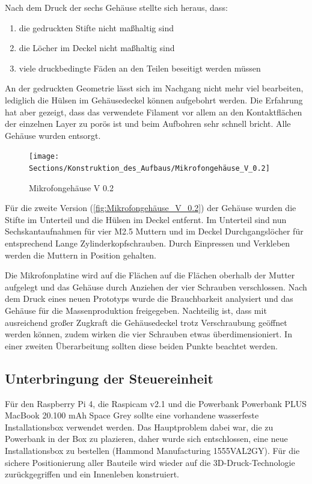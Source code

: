 Nach dem Druck der sechs Gehäuse stellte sich heraus, dass:

\begin{enumerate}
	\item die gedruckten Stifte nicht maßhaltig sind
	\item die Löcher im Deckel nicht maßhaltig sind
	\item viele druckbedingte Fäden an den Teilen beseitigt werden müssen
\end{enumerate}

An der gedruckten Geometrie lässt sich im Nachgang nicht mehr viel bearbeiten, lediglich die Hülsen im Gehäusedeckel können aufgebohrt werden. Die Erfahrung hat aber gezeigt, dass das verwendete Filament vor allem an den Kontaktflächen der einzelnen Layer zu porös ist und beim Aufbohren sehr schnell bricht. Alle Gehäuse wurden entsorgt.

\newpage

\begin{figure}[h]
	\begin{center}
		\texttt{[image: Sections/Konstruktion\_des\_Aufbaus/Mikrofongehäuse\_V\_0.2]}
	\end{center}
	\caption{Mikrofongehäuse V 0.2}
	\label{fig:Mikrofongehäuse_V_0.2}
\end{figure}

Für die zweite Version (\autoref{fig:Mikrofongehäuse_V_0.2}) der Gehäuse wurden die Stifte im Unterteil und die Hülsen im Deckel entfernt. Im Unterteil sind nun Sechskantaufnahmen für vier M2.5 Muttern und im Deckel Durchgangslöcher für entsprechend Lange Zylinderkopfschrauben. Durch Einpressen und Verkleben werden die Muttern in Position gehalten.

Die Mikrofonplatine wird auf die Flächen auf die Flächen oberhalb der Mutter aufgelegt und das Gehäuse durch Anziehen der vier Schrauben verschlossen. Nach dem Druck eines neuen Prototyps wurde die Brauchbarkeit analysiert und das Gehäuse für die Massenproduktion freigegeben. Nachteilig ist, dass mit ausreichend großer Zugkraft die Gehäusedeckel trotz Verschraubung geöffnet werden können, zudem wirken die vier Schrauben etwas überdimensioniert. In einer zweiten Überarbeitung sollten diese beiden Punkte beachtet werden.

\subsection{Unterbringung der Steuereinheit}

Für den Raspberry Pi 4, die Raspicam v2.1 und die Powerbank Powerbank PLUS MacBook 20.100 mAh Space Grey sollte eine vorhandene wasserfeste Installationsbox verwendet werden. Das Hauptproblem dabei war, die zu Powerbank in der Box zu plazieren, daher wurde sich entschlossen, eine neue Installationsbox zu bestellen (Hammond Manufacturing 1555VAL2GY). Für die sichere Positionierung aller Bauteile wird wieder auf die 3D-Druck-Technologie zurückgegriffen und ein Innenleben konstruiert.

